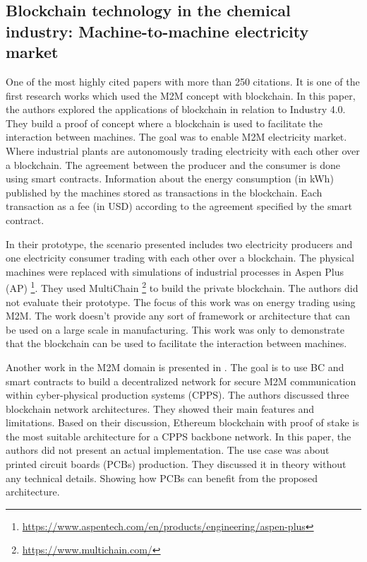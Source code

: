 \documentclass[runningheads]{llncs}
\begin{document}
\subsection{Blockchain technology in the chemical industry: Machine-to-machine electricity market \cite{Sikorski2017}}

One of the most highly cited papers with more than 250 citations. It is one of the first research works which used the M2M concept with blockchain. In this paper, the authors explored the applications of blockchain in relation to Industry 4.0. They build a proof of concept where a blockchain is used to facilitate the interaction between machines. The goal was to enable M2M electricity market. Where industrial plants are autonomously trading electricity with each other over a blockchain. The agreement between the producer and the consumer is done using smart contracts. Information about the energy consumption (in kWh) published by the machines stored as transactions in the blockchain. Each transaction as a fee (in USD) according to the agreement specified by the smart contract. \bigbreak

\noindent In their prototype, the scenario presented includes two electricity producers and one electricity consumer trading with each other over a blockchain. The physical machines were replaced with simulations of industrial processes in Aspen Plus (AP) \footnote{\url{https://www.aspentech.com/en/products/engineering/aspen-plus}}. They used MultiChain \footnote{\url{https://www.multichain.com/}} to build the private blockchain. The authors did not evaluate their prototype. The focus of this work was on energy trading using M2M. The work doesn't provide any sort of framework or architecture that can be used on a large scale in manufacturing. This work was only to demonstrate that the blockchain can be used to facilitate the interaction between machines. \bigbreak 

\noindent Another work in the M2M domain is presented in \cite{Afanasev2018}.  The goal is to use BC and smart contracts to build a decentralized network for secure M2M communication within cyber-physical production systems (CPPS). The authors discussed three blockchain network architectures. They showed their main features and limitations. Based on their discussion, Ethereum blockchain with proof of stake is the most suitable architecture for a CPPS backbone network. In this paper, the authors did not present an actual implementation. The use case was about printed circuit boards (PCBs) production. They discussed it in theory without any technical details.  Showing how PCBs can benefit from the proposed architecture.
 
\end{document}
